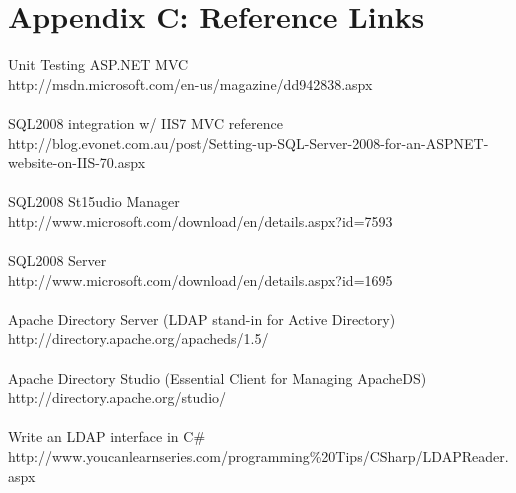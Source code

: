\documentclass[letterpaper]{article}
\begin{document}
\section{Appendix C: Reference Links}
Unit Testing ASP.NET MVC\\
\small{http://msdn.microsoft.com/en-us/magazine/dd942838.aspx}\\
\\
SQL2008 integration w/ IIS7 MVC reference\\
\small{http://blog.evonet.com.au/post/Setting-up-SQL-Server-2008-for-an-ASPNET-website-on-IIS-70.aspx}\\
\\
SQL2008 St15udio Manager\\
\small{http://www.microsoft.com/download/en/details.aspx?id=7593}\\
\\
SQL2008 Server\\
\small{http://www.microsoft.com/download/en/details.aspx?id=1695}\\
\\
Apache Directory Server (LDAP stand-in for Active Directory)\\
\small{http://directory.apache.org/apacheds/1.5/}\\
\\
Apache Directory Studio (Essential Client for Managing ApacheDS)\\
\small{http://directory.apache.org/studio/}\\
\\
Write an LDAP interface in C\#\\
\small{http://www.youcanlearnseries.com/programming\%20Tips/CSharp/LDAPReader.aspx}\\
\\
 
\end{document}
